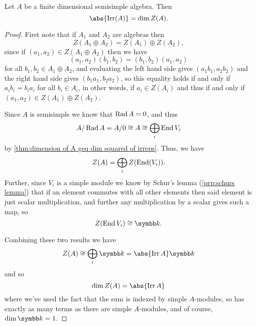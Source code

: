 \begin{lma}{}{}
    Let \(A\) be a finite dimensional semisimple algebra.
    Then
    \begin{equation}
        \abs{\Irr(A)} = \dim Z(A).
    \end{equation}
    \begin{proof}
        First note that if \(A_1\) and \(A_2\) are algebras then
        \begin{equation}
            Z(A_1 \oplus A_2) = Z(A_1) \oplus Z(A_2),
        \end{equation}
        since if \((a_1, a_2) \in Z(A_1 \oplus A_2)\) then we have
        \begin{equation}
            (a_1, a_2)(b_1, b_2) = (b_1, b_2)(a_1, a_2)
        \end{equation}
        for all \(b_1, b_2 \in A_1 \oplus A_2\), and evaluating the left hand side gives \((a_1b_1, a_2b_2)\) and the right hand side gives \((b_1a_1, b_2a_2)\), so this equality holds if and only if \(a_ib_i = b_ia_i\) for all \(b_i \in A_i\), in other words, if \(a_i \in Z(A_i)\) and thus if and only if \((a_1, a_2) \in Z(A_1) \oplus Z(A_2)\).
        
        Since \(A\) is semisimple we know that \(\operatorname{Rad} A = 0\), and thus
        \begin{equation}
            A/\operatorname{Rad} A = A/0 \cong A \cong \bigoplus_i \operatorname{End} V_i
        \end{equation}
        by \cref{thm:dimension of A geq dim squared of irreps}.
        Thus, we have
        \begin{equation}
            Z(A) = \bigoplus_i Z(\operatorname{End}(V_i)).
        \end{equation}
        Further, since \(V_i\) is a simple module we know by Schur's lemma (\cref{prp:schurs lemma}) that if an element commutes with all other elements then said element is just scalar multiplication, and further any multiplication by a scalar gives such a map, so
        \begin{equation}
            Z(\End V_i) \isomorphic \field.
        \end{equation}
        
        Combining these two results we have
        \begin{equation}
            Z(A) \isomorphic \bigoplus_i \field = \abs{\Irr A} \field
        \end{equation}
        and so
        \begin{equation}
            \dim Z(A) = \abs{\Irr A}
        \end{equation}
        where we've used the fact that the sum is indexed by simple \(A\)-modules, so has exactly as many terms as there are simple \(A\)-modules, and of course, \(\dim \field = 1\).
    \end{proof}
\end{lma}

